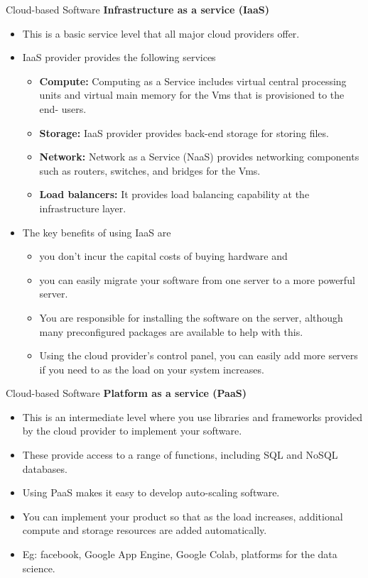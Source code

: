 \documentclass{beamer}
\begin{document}
\begin{frame}{Cloud-based Software}
	\textbf{Infrastructure as a service (IaaS) }
\begin{itemize}
	\item This is a basic service level that all major cloud providers offer. 
	\item IaaS provider provides the following services
	\begin{itemize}
		\item\textbf{Compute:} Computing as a Service includes virtual central processing units and virtual main memory for the Vms that is provisioned to the end- users.
		\item\textbf{Storage:} IaaS provider provides back-end storage for storing files.
		\item\textbf{Network:} Network as a Service (NaaS) provides networking components such as routers, switches, and bridges for the Vms.
		\item\textbf{Load balancers:} It provides load balancing capability at the infrastructure layer.
	\end{itemize}
\item The key benefits of using IaaS are
\begin{itemize}
	\item you don’t incur the capital costs of buying hardware and 
	\item you can easily migrate your software from one server to a more powerful server. 
	\item You are responsible for installing the software on the server, although many preconfigured packages 
	are available to help with this. 
	\item Using the cloud provider’s control panel, you can easily add more servers if you need to as the load on your system increases.
\end{itemize}  
\end{itemize}
\end{frame}
\begin{frame}{Cloud-based Software}
	\textbf{Platform as a service (PaaS) }
	\begin{itemize}
		\item This is an intermediate level where you use libraries and frameworks provided by the cloud provider to 
		implement your software.
		\item These provide access to a range of functions, including SQL and NoSQL databases. 
		\item Using PaaS makes it easy to develop auto-scaling software. 
		\item You can implement your product so that as the load increases, additional compute and storage 
		resources are added automatically.
		\item Eg: facebook, Google App Engine, Google Colab, platforms for the data science.
	\end{itemize}
\end{frame}
\end{document}

